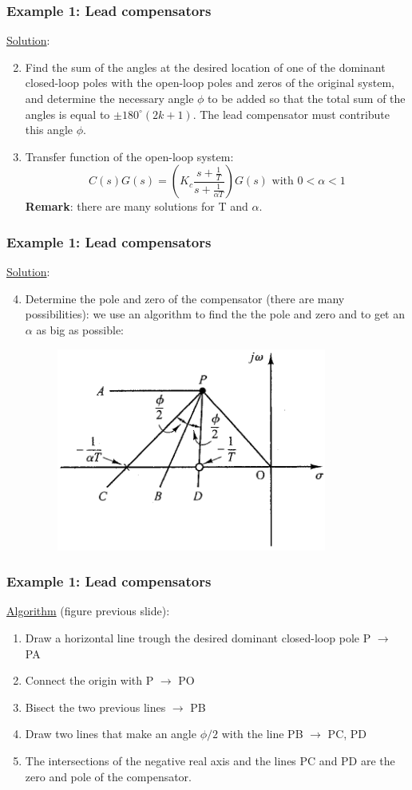 \begin{frame}
	\frametitle{Example 1: Lead compensators}
	\underline{Solution}:
	\begin{enumerate}
		\setcounter{enumi}{1}
		\item  Find the sum of the angles at the desired location of one of the dominant closed-loop poles with the open-loop poles and zeros of the original system, and determine the necessary angle $\phi$ to be added so that the total sum of the angles is equal to $\pm 180^{\circ}(2k + 1)$. The lead compensator must contribute this angle $\phi$.
		\item Transfer function of the open-loop system: $$C(s)G(s)=(K_c\frac{s+\frac{1}{T}}{s+\frac{1}{\alpha T}})G(s) \text{ with } 0<\alpha<1$$
		\textbf{Remark}: there are many solutions for T and $\alpha$. 
	\end{enumerate}
\end{frame}

\begin{frame}
	\frametitle{Example 1: Lead compensators}
	\underline{Solution}:
	\begin{enumerate}
		\setcounter{enumi}{3}
		\item Determine the pole and zero of the compensator (there are many possibilities): we use an algorithm to find the the pole and zero and to get an $\alpha$ as big as possible:
		\begin{figure}
			\centering
			\includegraphics[width=0.6\linewidth]{Ex1_draw_algoritme}
		\end{figure}
	\end{enumerate}
\end{frame}

\begin{frame}
	\frametitle{Example 1: Lead compensators}
	\underline{Algorithm} (figure previous slide):
	\begin{enumerate}
		\item Draw a horizontal line trough the desired dominant closed-loop pole P $\rightarrow$ PA
		\item Connect the origin with P $\rightarrow$ PO
		\item Bisect the two previous lines $\rightarrow$ PB
		\item Draw two lines that make an angle $\phi/2$ with the line PB $\rightarrow$ PC, PD
		\item The intersections of the negative real axis and the lines PC and PD are the zero and pole of the compensator. 
	\end{enumerate}
\end{frame}

